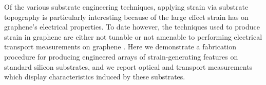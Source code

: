 \documentclass[%
 aip,
 apl,%
 amsmath,amssymb,
 reprint,%
]{revtex4-1}
\begin{document}
Of the various substrate engineering techniques, applying strain via substrate topography is particularly interesting
because of the large effect strain has on graphene's electrical 
properties\cite{guinea2010energy, pereira2009strain, levy2010strain}. 
To date however, the techniques used to produce strain in graphene are either not tunable\cite{levy2010strain}
or not amenable to performing electrical transport measurements on graphene
\cite{Tomori2011, mohiuddin2009uniaxial, ni2008uniaxial, gill2015mechanical}.
Here we demonstrate a fabrication procedure for producing engineered arrays of strain-generating features on standard silicon
substrates, and we report optical and transport measurements which display characteristics induced by these substrates.

\end{document}
